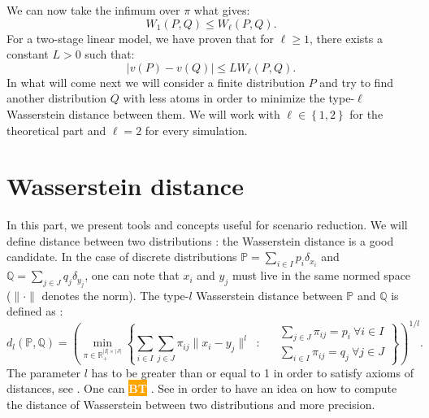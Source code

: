 \documentclass{amsart}
\newcommand{\nb}[3]{
		{\colorbox{#2}{\bfseries\sffamily\tiny\textcolor{white}{#1}}}
		{\textcolor{#2}{\text{$\blacktriangleright$}{\textcolor{#2}{#3}}\text{$\blacktriangleleft$}}}}
\newcommand{\bt}[1]{\nb{BT}{orange}{#1}}
\begin{document}
We can now take the infimum over $\pi$ what gives:
$$
W_1\left(P,Q\right)\leq W_\ell\left(P,Q\right).
$$
For a two-stage linear model, we have proven that for $\ell\geq1$, there exists a constant $L>0$ such that:
$$
\lvert v\left(P\right)-v\left(Q\right)\rvert \leq LW_\ell\left(P,Q\right).
$$
In what will come next we will consider a finite distribution $P$ and try to find another distribution $Q$ with less atoms in order to minimize the type-$\ell$ Wasserstein distance between them. We will work with $\ell\in\left\{1,2\right\}$ for the theoretical part and $\ell=2$ for every simulation.
\section{Wasserstein distance}
In this part, we present tools and concepts useful for scenario reduction. We will define distance between two distributions : the Wasserstein distance is a good candidate. In the case of discrete distributions $\mathbb{P}=\sum_{i\in I}p_i\delta_{x_i}$ and $\mathbb{Q}=\sum_{j\in J}q_j\delta_{y_j}$, one can note that $x_i$ and $y_j$ must live in the same normed space ($\lVert\cdot\rVert$ denotes the norm). The type-$l$ Wasserstein distance between $\mathbb{P}$ and $\mathbb{Q}$ is defined as :  
\[
d_l(\mathbb{P},\mathbb{Q})=\left(\min_{\pi\in\mathbb{R}_+^{\lvert I\rvert\times\lvert J\rvert}}\left\{ 
\sum_{i\in I}\sum_{j\in J}\pi_{ij}\lVert x_i-y_j\rVert^l \: \text{ : } \:  \begin{aligned}
& \sum_{j\in J}\pi_{ij}=p_i \: \forall i\in I \\
& \sum_{i\in I}\pi_{ij}=q_j \: \forall j\in J
\end{aligned}\right\}\right)^{1/l}.
\]
The parameter $l$ has to be greater than or equal to 1 in order to satisfy axioms of distances, see . One can \bt{To prove that $d^\ell$ is distance, the difficult part is the triangle inequality. It is a distance for $\ell \geq 1$ and the proof of the triangle inequality is here called the "gluing lemma" (Peyré-Cuturi chapter 1 for our "simple" case). This gluing lemma uses Minkowski's inequality in the case $\ell\geq1$ so that's the reason why. 
It is still an interesting question for $0 < \ell \leq 1$. We have $d_\ell^\ell$ (and not $d\ell$ itself) is a distance as $(x,y) \mapsto \lVert x - y \rVert^\ell$ is already a distance when $0 < \ell \leq 1$ thanks to Minkowski's inequality in the case $\ell \leq 1$.
}. See  in order to have an idea on how to compute the distance of Wasserstein between two distributions and more precision.
\newline
\end{document}
